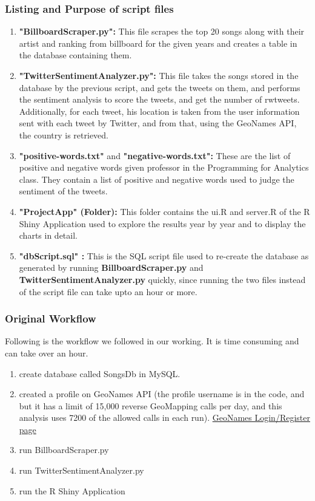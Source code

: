 \documentclass{article}
\begin{document}
\subsubsection{Listing and Purpose of script files}
\begin{enumerate}
\item \textbf{"BillboardScraper.py": } This file scrapes the top 20 songs along with their artist and ranking from billboard for the given years and creates a table in the database containing them.
\item \textbf{"TwitterSentimentAnalyzer.py": } This file takes the songs stored in the database by the previous script, and gets the tweets on them, and performs the sentiment analysis to score the tweets, and get the number of rwtweets. Additionally, for each tweet, his location is taken from the user information sent with each tweet by Twitter, and from that, using the GeoNames API, the country is retrieved.
\item \textbf{"positive-words.txt"} and \textbf{"negative-words.txt": } These are the list of positive and negative words given professor in the Programming for Analytics class. They contain a list of positive and negative words used to judge the sentiment of the tweets.
\item \textbf{"ProjectApp" (Folder): } This folder contains the ui.R and server.R of the R Shiny Application used to explore the results year by year and to display the charts in detail.
\item \textbf{"dbScript.sql" :} This is the SQL script file used to re-create the database as generated by running \textbf{BillboardScraper.py} and \textbf{TwitterSentimentAnalyzer.py} quickly, since running the two files instead of the script file can take upto an hour or more.
\end{enumerate}

\subsubsection{Original Workflow}
Following is the workflow we followed in our working. It is time consuming and can take over an hour.

\begin{enumerate}
\item create database called SongsDb in MySQL.
\item created a profile on GeoNames API (the profile username is in the code, and but it has a limit of 15,000 reverse GeoMapping calls per day, and this analysis uses 7200 of the allowed calls in each run). \href{http://www.geonames.org/login}{GeoNames Login/Register page}
\item run BillboardScraper.py
\item run TwitterSentimentAnalyzer.py
\item run the R Shiny Application
\end{enumerate}
\end{document}
